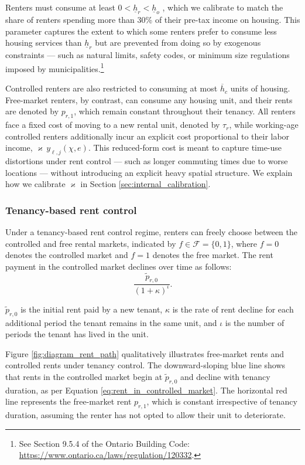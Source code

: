 \documentclass[parskip=full]{article}
\begin{document}
Renters must consume at least $0<\underline{h}_{r}<\underline{h}_{o}$ \citep{gervais,sommeretal-2013,sommersullivan-2017,kaplanetal-2019}, which we calibrate to match the share of renters spending more than 30\% of their pre-tax income on housing. This parameter captures the extent to which some renters prefer to consume less housing services than $\underline{h}_{r}$ but are prevented from doing so by exogenous constraints — such as natural limits, safety codes, or minimum size regulations imposed by municipalities.\footnote{See Section 9.5.4 of the Ontario Building Code: \url{https://www.ontario.ca/laws/regulation/120332}.} 

Controlled renters are also restricted to consuming at most $\overline{h}_c$ units of housing. Free-market renters, by contrast, can consume any housing unit, and their rents are denoted by $p_{r,1}$, which remain constant throughout their tenancy. All renters face a fixed cost of moving to a new rental unit, denoted by $\tau_r$, while working-age controlled renters additionally incur an explicit cost proportional to their labor income, $\varkappa\, y_{\ell,j}(\chi,e)$. This reduced-form cost is meant to capture time-use distortions under rent control — such as longer commuting times due to worse locations — without introducing an explicit heavy spatial structure. We explain how we calibrate $\varkappa$ in Section \ref{sec:internal_calibration}. 

\subsubsection{Tenancy-based rent control}

Under a tenancy-based rent control regime, renters can freely choose between the controlled and free rental markets, indicated by $f \in \mathcal{F}=\{0,1\}$, where $f=0$ denotes the controlled market and $f=1$ denotes the free market. The rent payment in the controlled market declines over time as follows:
\begin{equation}\label{eq:rent_in_controlled_market}
\frac{\tilde{p}_{r,0}}{(1+\kappa)^{\iota}}.
\end{equation} 

\noindent $\tilde{p}_{r,0}$ is the initial rent paid by a new tenant, $\kappa$ is the rate of rent decline for each additional period the tenant remains in the same unit, and $\iota$ is the number of periods the tenant has lived in the unit. 

Figure \ref{fig:diagram_rent_path} qualitatively illustrates free-market rents and controlled rents under tenancy control. The downward-sloping blue line shows that rents in the controlled market begin at $\tilde{p}_{r,0}$ and decline with tenancy duration, as per Equation \eqref{eq:rent_in_controlled_market}. The horizontal red line represents the free-market rent $p_{r,1}$, which is constant irrespective of tenancy duration, assuming the renter has not opted to allow their unit to deteriorate. 
\end{document}
